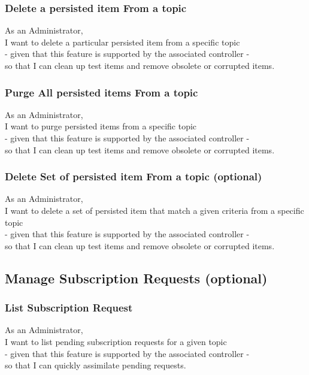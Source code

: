 \subsubsection{Delete a persisted item From a topic}

As an Administrator,\\
I want to delete a particular persisted item from a specific topic\\
- given that this feature is supported by the associated controller -\\
so that I can clean up test items and remove obsolete or corrupted items.

\subsubsection{Purge All persisted items From a topic}

As an Administrator,\\
I want to purge persisted items from a specific topic\\
- given that this feature is supported by the associated controller -\\
so that I can clean up test items and remove obsolete or corrupted items.

\subsubsection{Delete Set of persisted item From a topic (optional)}

As an Administrator,\\
I want to delete a set of persisted item that match a given criteria from a specific topic\\
- given that this feature is supported by the associated controller -\\
so that I can clean up test items and remove obsolete or corrupted items.

\subsection{Manage Subscription Requests (optional)}\label{sec:subscription-requests}

\subsubsection{List Subscription Request}
As an Administrator,\\
I want to list pending subscription requests for a given topic\\
- given that this feature is supported by the associated controller -\\
so that I can quickly assimilate pending requests.

